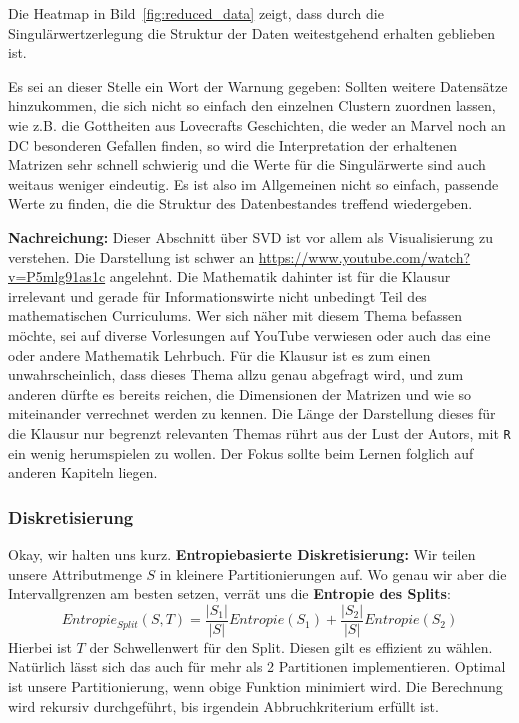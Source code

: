 Die Heatmap in Bild~\ref{fig:reduced_data} zeigt, dass durch die Singulärwertzerlegung
die Struktur der Daten weitestgehend erhalten geblieben ist.

Es sei an dieser Stelle ein Wort der Warnung gegeben: Sollten weitere Datensätze
hinzukommen, die sich nicht so einfach den einzelnen Clustern zuordnen lassen,
wie z.B. die Gottheiten aus Lovecrafts Geschichten, die weder an Marvel noch an DC
besonderen Gefallen finden, so wird die Interpretation der erhaltenen Matrizen
sehr schnell schwierig und die Werte für die Singulärwerte sind auch weitaus weniger
eindeutig. Es ist also im Allgemeinen nicht so einfach, passende Werte zu finden,
die die Struktur des Datenbestandes treffend wiedergeben.

\textbf{Nachreichung:} Dieser Abschnitt über SVD ist vor allem als
Visualisierung zu verstehen. Die Darstellung ist schwer an
\url{https://www.youtube.com/watch?v=P5mlg91as1c} angelehnt. 
Die Mathematik dahinter ist für die Klausur
irrelevant und gerade für Informationswirte nicht unbedingt Teil des mathematischen
Curriculums. Wer sich näher mit diesem Thema befassen möchte, sei auf diverse
Vorlesungen auf YouTube verwiesen oder auch das eine oder andere Mathematik
Lehrbuch. Für die Klausur ist es zum einen unwahrscheinlich, dass dieses Thema
allzu genau abgefragt wird, und zum anderen dürfte es bereits reichen, die
Dimensionen der Matrizen und wie so miteinander verrechnet werden zu kennen.
Die Länge der Darstellung dieses für die Klausur nur begrenzt relevanten Themas
rührt aus der Lust der Autors, mit \texttt{R} ein wenig herumspielen zu wollen.
Der Fokus sollte beim Lernen folglich auf anderen Kapiteln liegen.

\subsubsection{Diskretisierung}
Okay, wir halten uns kurz.  \textbf{Entropiebasierte Diskretisierung:} Wir teilen
unsere Attributmenge \(S\) in kleinere Partitionierungen auf. Wo genau wir aber
die Intervallgrenzen am besten setzen, verrät uns die \textbf{Entropie des Splits}:
\[
	Entropie_{Split}(S,T) = \frac{|S_1|}{|S|} Entropie(S_1) +
	\frac{|S_2|}{|S|} Entropie(S_2)
\]
Hierbei ist \(T\) der Schwellenwert für den Split. Diesen gilt es effizient zu wählen.
Natürlich lässt sich das auch für mehr als 2 Partitionen implementieren. Optimal ist unsere
Partitionierung, wenn obige Funktion minimiert wird. Die Berechnung wird rekursiv
durchgeführt, bis irgendein Abbruchkriterium erfüllt ist.

